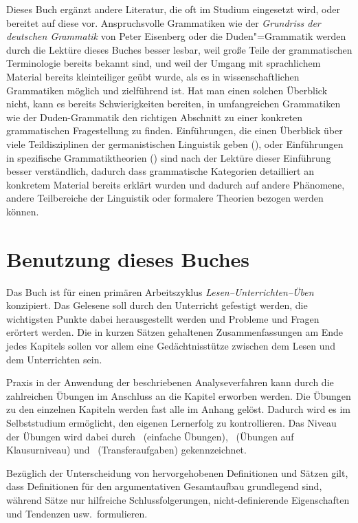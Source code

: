 \enlargethispage{1\baselineskip}
Dieses Buch ergänzt andere Literatur, die oft im Studium eingesetzt wird, oder bereitet auf diese vor.
Anspruchsvolle Grammatiken wie der \textit{Grundriss der deutschen Grammatik} von Peter Eisenberg \citep{Eisenberg1,Eisenberg2} oder die Duden"=Grammatik \citep{Duden8} werden durch die Lektüre dieses Buches besser lesbar, weil große Teile der grammatischen Terminologie bereits bekannt sind, und weil der Umgang mit sprachlichem Material bereits kleinteiliger geübt wurde, als es in wissenschaftlichen Grammatiken möglich und zielführend ist.
Hat man einen solchen Überblick nicht, kann es bereits Schwierigkeiten bereiten, in umfangreichen Grammatiken wie der Duden-Grammatik den richtigen Abschnitt zu einer konkreten grammatischen Fragestellung zu finden.
Einführungen, die einen Überblick über viele Teildisziplinen der germanistischen Linguistik geben (\zB \citealp{EgL07,SgL07}), oder Einführungen in spezifische Grammatiktheorien (\zB \citealp{Grewendorf02, Mueller08}) sind nach der Lektüre dieser Einführung besser verständlich, dadurch dass grammatische Kategorien detailliert an konkretem Material bereits erklärt wurden und dadurch auf andere Phänomene, andere Teilbereiche der Linguistik oder formalere Theorien bezogen werden können.

\section*{Benutzung dieses Buches}

Das Buch ist für einen primären Arbeitszyklus \textit{Lesen--Unterrichten--Üben} konzipiert.
Das Gelesene soll durch den Unterricht gefestigt werden, die wichtigsten Punkte dabei herausgestellt werden und Probleme und Fragen erörtert werden.
Die in kurzen Sätzen gehaltenen Zusammenfassungen am Ende jedes Kapitels sollen vor allem eine Gedächtnisstütze zwischen dem Lesen und dem Unterrichten sein.

Praxis in der Anwendung der beschriebenen Analyseverfahren kann durch die zahlreichen Übungen im Anschluss an die Kapitel erworben werden.
Die Übungen zu den einzelnen Kapiteln werden fast alle im Anhang gelöst.
Dadurch wird es im Selbststudium ermöglicht, den eigenen Lernerfolg zu kontrollieren.
Das Niveau der Übungen wird dabei durch \onestar\ (einfache Übungen), \twostar\ (Übungen auf Klausurniveau) und \tristar\ (Transferaufgaben) gekennzeichnet.

Bezüglich der Unterscheidung von hervorgehobenen Definitionen und Sätzen gilt, dass Definitionen für den argumentativen Gesamtaufbau grundlegend sind, während Sätze nur hilfreiche Schlussfolgerungen, nicht-definierende Eigenschaften und Tendenzen usw.\ formulieren.

